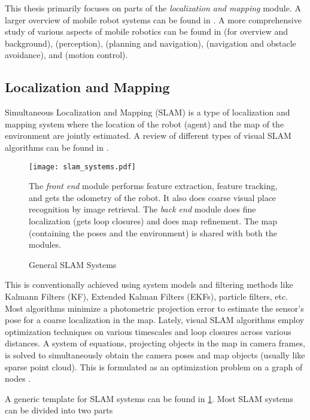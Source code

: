 This thesis primarily focuses on parts of the \emph{localization and
mapping} module. A larger overview of mobile robot systems can be
found in \cite{Rubio2019ARO}. A more comprehensive study of various
aspects of mobile robotics can be found in
\cite{Choset2007PrinciplesOR} (for overview and background),
\cite{Thrun2005ProbabilisticR} (perception), \cite{Patle2019ARO}
(planning and navigation), \cite{Anish2017MobileRN} (navigation and
obstacle avoidance), and \cite{Featherstone2000RobotDE} (motion
control).

\subsection{Localization and Mapping}
\label{subsec:intro-loc-and-map}

Simultaneous Localization and Mapping (SLAM) is a type of localization
and mapping system where the location of the robot (agent) and the map
of the environment are jointly estimated. A review of different types
of visual SLAM algorithms can be found in \cite{Barros2022ACS,
Taketomi2017VisualSA, Cadena2016PastPA}.

\begin{figure}
    \centering
    \texttt{[image: slam\_systems.pdf]}
    \caption{General SLAM Systems}
    \small
        The \emph{front end} module performs feature extraction,
        feature tracking, and gets the odometry of the robot. It also
        does coarse visual place recognition by image retrieval. The
        \emph{back end} module does fine localization (gets loop
        closures) and does map refinement. The map (containing the
        poses and the environment) is shared with both the modules.
    \label{fig:slam_system}
\end{figure}

This is conventionally achieved using system models and filtering
methods like Kalmann Filters (KF), Extended Kalman Filters (EKFs),
particle filters, etc. Most algorithms minimize a photometric
projection error to estimate the sensor's pose for a coarse
localization in the map. Lately, visual SLAM algorithms employ
optimization techniques on various timescales and loop closures across
various distances. A system of equations, projecting objects in the
map in camera frames, is solved to simultaneously obtain the camera
poses and map objects (usually like sparse point cloud). This is
formulated as an optimization problem on a graph of nodes
\cite{Grisetti2010ATO}.

A generic template for SLAM systems can be found in
\cref{fig:slam_system}. Most SLAM systems can be divided into two
parts

